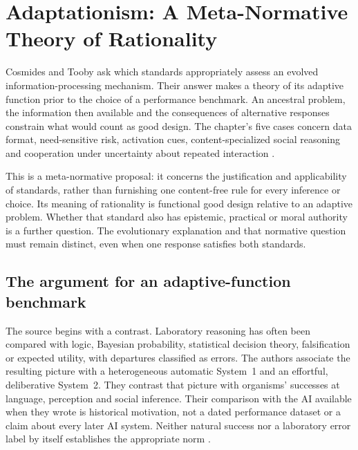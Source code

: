 \chapter{Adaptationism: A Meta-Normative Theory of Rationality}
\label{sec:p11-rationality-10-6}

Cosmides and Tooby ask which standards appropriately assess an evolved
information-processing mechanism. Their answer makes a theory of its
adaptive function prior to the choice of a performance benchmark.
An ancestral problem, the information then available and the consequences
of alternative responses constrain what would count as good design.
The chapter's five cases concern data format, need-sensitive risk,
activation cues, content-specialized social reasoning and cooperation
under uncertainty about repeated interaction
\cite[chap.~10.6, pp.~633--642]{CosmidesTooby2021Adaptationism}.

This is a meta-normative proposal: it concerns the justification and
applicability of standards, rather than furnishing one content-free rule
for every inference or choice. Its meaning of rationality is functional
good design relative to an adaptive problem. Whether that standard also
has epistemic, practical or moral authority is a further question.
The evolutionary explanation and that normative question must remain
distinct, even when one response satisfies both standards.

\section{The argument for an adaptive-function benchmark}
\label{sec:p11-rat106-argument}

The source begins with a contrast. Laboratory reasoning has often been
compared with logic, Bayesian probability, statistical decision theory,
falsification or expected utility, with departures classified as errors.
The authors associate the resulting picture with a heterogeneous
automatic System~1 and an effortful, deliberative System~2. They contrast
that picture with organisms' successes at language, perception and
social inference. Their comparison with the AI available when they wrote
is historical motivation, not a dated performance dataset or a claim
about every later AI system. Neither natural success nor a laboratory
error label by itself establishes the appropriate norm
\cite[pp.~633--634]{CosmidesTooby2021Adaptationism}.

